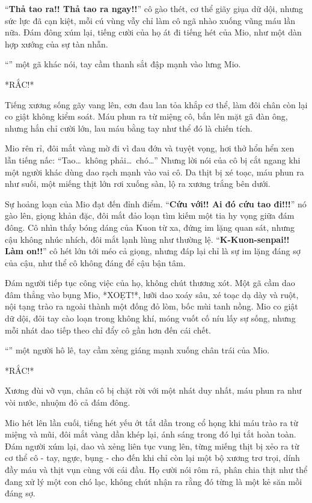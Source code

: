 \documentclass[../main.tex]{subfiles}
\begin{document}
``\textbf{Thả tao ra!! Thả tao ra ngay!!}'' cô gào thét, cơ thể giãy giụa dữ dội, nhưng sức lực đã cạn kiệt, mỗi cú vùng vẫy chỉ làm cô ngã nhào xuống vũng máu lần nữa. Đám đông xúm lại, tiếng cười của họ át đi tiếng hét của Mio, như một dàn hợp xướng của sự tàn nhẫn.

``'' một gã khác nói, tay cầm thanh sắt đập mạnh vào lưng Mio.

*RẮC!*

Tiếng xương sống gãy vang lên, cơn đau lan tỏa khắp cơ thể, làm đôi chân còn lại co giật không kiểm soát. Máu phun ra từ miệng cô, bắn lên mặt gã đàn ông, nhưng hắn chỉ cười lớn, lau máu bằng tay như thể đó là chiến tích.

Mio rên rỉ, đôi mắt vàng mờ đi vì đau đớn và tuyệt vọng, hơi thở hổn hển xen lẫn tiếng nấc: ``Tao\dots\ không phải\dots\ chó\dots'' Nhưng lời nói của cô bị cắt ngang khi một người khác dùng dao rạch mạnh vào vai cô. Da thịt bị xé toạc, máu phun ra như suối, một miếng thịt lớn rơi xuống sàn, lộ ra xương trắng bên dưới.

Sự hoảng loạn của Mio đạt đến đỉnh điểm. ``\textbf{Cứu với!! Ai đó cứu tao đi!!!}'' nó gào lên, giọng khản đặc, đôi mắt đảo loạn tìm kiếm một tia hy vọng giữa đám đông. Cô nhìn thấy bóng dáng của Kuon từ xa, đứng im lặng quan sát, nhưng cậu không nhúc nhích, đôi mắt lạnh lùng như thường lệ. ``\textbf{K-Kuon-senpai!! Làm on!!}'' cô hét lớn tới méo cả giọng, nhưng đáp lại chỉ là sự im lặng đáng sợ của cậu, như thể cô không đáng để cậu bận tâm.

Đám người tiếp tục công việc của họ, không chút thương xót. Một gã cầm dao đâm thẳng vào bụng Mio, *XOẸT!*, lưỡi dao xoáy sâu, xé toạc dạ dày và ruột, nội tạng trào ra ngoài thành một đống đỏ lòm, bốc mùi tanh nồng. Mio co giật dữ dội, đôi tay cào loạn trong không khí, móng vuốt cố níu lấy sự sống, nhưng mỗi nhát dao tiếp theo chỉ đẩy cô gần hơn đến cái chết.

``'' một người hô lê, tay cầm xẻng giáng mạnh xuống chân trái của Mio.

*RẮC!*

Xương đùi vỡ vụn, chân cô bị chặt rời với một nhát duy nhất, máu phun ra như vòi nước, nhuộm đỏ cả đám đông.

Mio hét lên lần cuối, tiếng hét yếu ớt tắt dần trong cổ họng khi máu trào ra từ miệng và mũi, đôi mắt vàng dần khép lại, ánh sáng trong đó lụi tắt hoàn toàn. Đám người xúm lại, dao và xẻng liên tục vung lên, từng miếng thịt bị xẻo ra từ cơ thể cô - tay, ngực, bụng - cho đến khi chỉ còn lại một bộ xương trơ trọi, dính đầy máu và thịt vụn cùng với cái đầu. Họ cười nói rôm rả, phân chia thịt như thể đang xử lý một con chó lạc, không chút nhận ra rằng đó từng là một kẻ săn mồi đáng sợ.
\end{document}
